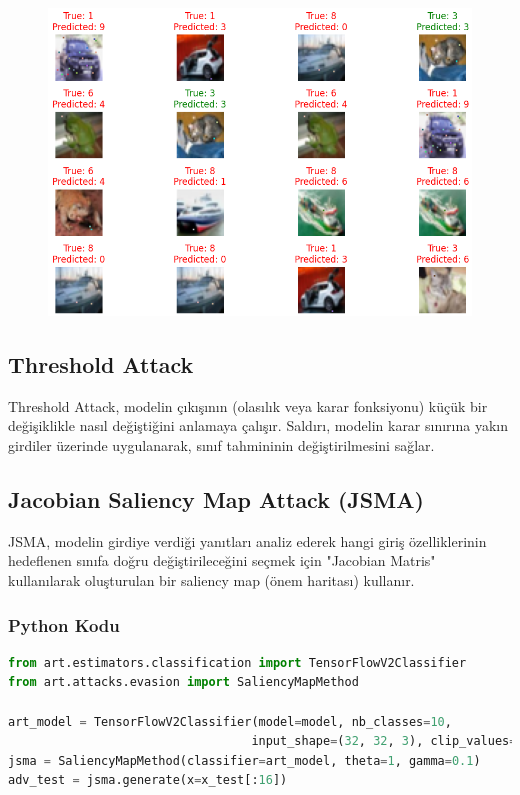 \begin{figure}[h]
    \centering
    \includegraphics[width=1\textwidth]{images/pixel_attack_results.png}
    \caption{}
\end{figure}

\newpage

\subsection{Threshold Attack}

Threshold Attack, modelin çıkışının (olasılık veya karar fonksiyonu) küçük bir değişiklikle nasıl değiştiğini anlamaya çalışır. Saldırı, modelin karar sınırına yakın girdiler üzerinde uygulanarak, sınıf tahmininin değiştirilmesini sağlar.

\newpage

\subsection{Jacobian Saliency Map Attack (JSMA)} 

JSMA, modelin girdiye verdiği yanıtları analiz ederek hangi giriş özelliklerinin hedeflenen sınıfa doğru değiştirileceğini seçmek için "Jacobian Matris" kullanılarak oluşturulan bir saliency map (önem haritası) kullanır. 

\subsubsection{Python Kodu}

\begin{lstlisting}[language=Python]
from art.estimators.classification import TensorFlowV2Classifier
from art.attacks.evasion import SaliencyMapMethod

art_model = TensorFlowV2Classifier(model=model, nb_classes=10, 
                                  input_shape=(32, 32, 3), clip_values=(0, 1))
jsma = SaliencyMapMethod(classifier=art_model, theta=1, gamma=0.1)
adv_test = jsma.generate(x=x_test[:16])
\end{lstlisting}

